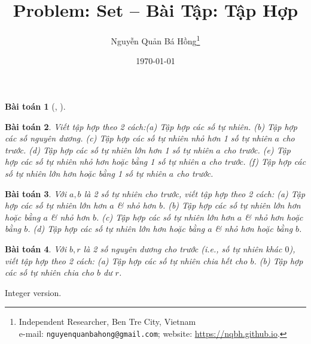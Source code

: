 \documentclass{article}
\title{Problem: Set -- Bài Tập: Tập Hợp}
\author{Nguyễn Quản Bá Hồng\footnote{Independent Researcher, Ben Tre City, Vietnam\\e-mail: \texttt{nguyenquanbahong@gmail.com}; website: \url{https://nqbh.github.io}.}}
\date{\today}
\newtheorem{baitoan}{Bài toán}
\begin{document}
\maketitle


\begin{baitoan}[\cite{SGK_Toan_6_CTST_tap_1}, ]
	
\end{baitoan}

\begin{baitoan}
	Viết tập hợp theo 2 cách:(a) Tập hợp các số tự nhiên. (b) Tập hợp các số nguyên dương. (c) Tập hợp các số tự nhiên nhỏ hơn 1 số tự nhiên $a$ cho trước. (d) Tập hợp các số tự nhiên lớn hơn 1 số tự nhiên $a$ cho trước. (e) Tập hợp các số tự nhiên nhỏ hơn hoặc bằng 1 số tự nhiên $a$ cho trước. (f) Tập hợp các số tự nhiên lớn hơn hoặc bằng 1 số tự nhiên $a$ cho trước.
\end{baitoan}

\begin{baitoan}
	Với $a,b$ là 2 số tự nhiên cho trước, viết tập hợp theo 2 cách: (a) Tập hợp các số tự nhiên lớn hơn $a$ \& nhỏ hơn $b$. (b) Tập hợp các số tự nhiên lớn hơn hoặc bằng $a$ \& nhỏ hơn $b$. (c) Tập hợp các số tự nhiên lớn hơn $a$ \& nhỏ hơn hoặc bằng $b$. (d) Tập hợp các số tự nhiên lớn hơn hoặc bằng $a$ \& nhỏ hơn hoặc bằng $b$.
\end{baitoan}

\begin{baitoan}
	Với $b,r$ là 2 số nguyên dương cho trước (i.e., số tự nhiên khác $0$), viết tập hợp theo 2 cách: (a) Tập hợp các số tự nhiên chia hết cho $b$. (b) Tập hợp các số tự nhiên chia cho $b$ dư $r$.
\end{baitoan}
Integer version.


\printbibliography[heading=bibintoc]
	
\end{document}
